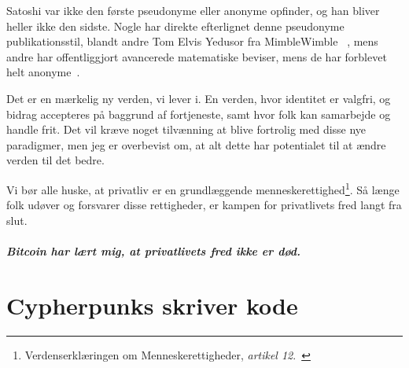 \documentclass[paper=6in:9in,pagesize=pdftex,headinclude=on,footinclude=on,12pt]{scrbook}
\begin{document}
Satoshi var ikke den første pseudonyme eller anonyme opfinder, og han bliver heller ikke den sidste. Nogle har direkte efterlignet denne pseudonyme publikationsstil, blandt andre Tom Elvis Yedusor fra MimbleWimble~\cite{mimblewimble-origin} , mens andre har offentliggjort avancerede matematiske beviser, mens de har forblevet helt anonyme~\cite{4chan-math}.

Det er en mærkelig ny verden, vi lever i. En verden, hvor identitet er valgfri, og bidrag accepteres på baggrund af fortjeneste, samt hvor folk kan samarbejde og handle frit. Det vil kræve noget tilvænning at blive fortrolig med disse nye paradigmer, men jeg er overbevist om, at alt dette har potentialet til at ændre verden til det bedre.

Vi bør alle huske, at privatliv er en grundlæggende menneskerettighed\footnote{Verdenserklæringen om Menneskerettigheder, \textit{artikel 12}.~\cite{article12}}. Så længe folk udøver og forsvarer disse rettigheder, er kampen for privatlivets fred langt fra slut.\paragraph{Bitcoin har lært mig, at privatlivets fred ikke er død.}%
%
%
%
%

\chapter{Cypherpunks skriver kode}
\label{les:20}
\end{document}
